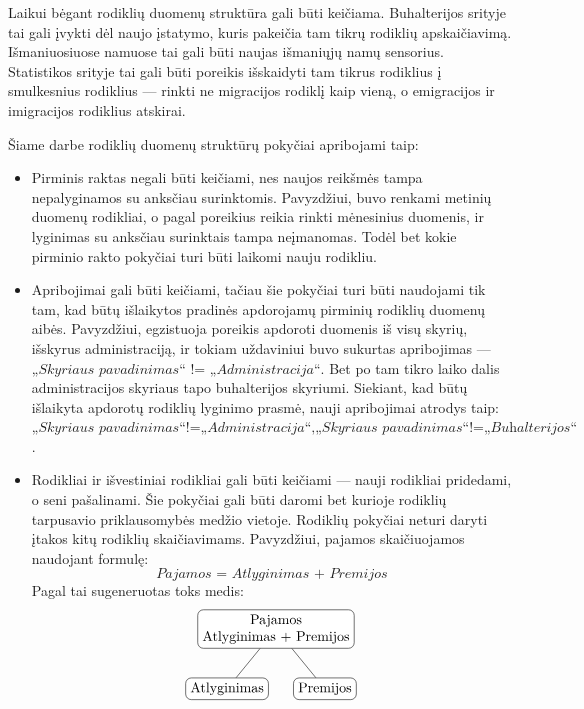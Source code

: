 \documentclass{VUMIFPSbakalaurinis}
\begin{document}
Laikui bėgant rodiklių duomenų struktūra gali būti keičiama. Buhalterijos srityje tai gali įvykti dėl naujo įstatymo, kuris pakeičia tam tikrų rodiklių apskaičiavimą. Išmaniuosiuose namuose tai gali būti naujas išmaniųjų namų sensorius. Statistikos srityje tai gali būti poreikis išskaidyti tam tikrus rodiklius į smulkesnius rodiklius — rinkti ne migracijos rodiklį kaip vieną, o emigracijos ir imigracijos rodiklius atskirai. \par
Šiame darbe rodiklių duomenų struktūrų pokyčiai apribojami taip:
\begin{itemize}
    \item Pirminis raktas negali būti keičiami, nes naujos reikšmės tampa nepalyginamos su anksčiau surinktomis. Pavyzdžiui, buvo renkami metinių duomenų rodikliai, o pagal poreikius reikia rinkti mėnesinius duomenis, ir lyginimas su anksčiau surinktais tampa neįmanomas. Todėl bet kokie pirminio rakto pokyčiai turi būti laikomi nauju rodikliu. 
    \item Apribojimai gali būti keičiami, tačiau šie pokyčiai turi būti naudojami tik tam, kad būtų išlaikytos pradinės apdorojamų pirminių rodiklių duomenų aibės. Pavyzdžiui, egzistuoja poreikis apdoroti duomenis iš visų skyrių, išskyrus administraciją, ir tokiam uždaviniui buvo sukurtas apribojimas — \(\textit{„Skyriaus pavadinimas“ != „Administracija“}\). Bet po tam tikro laiko dalis administracijos skyriaus tapo buhalterijos skyriumi. Siekiant, kad būtų išlaikyta apdorotų rodiklių lyginimo prasmė, nauji apribojimai atrodys taip: \(\textit{„Skyriaus pavadinimas“!=„Administracija“}, \textit{„Skyriaus pavadinimas“!=„Buhalterijos“}\).
    \item Rodikliai ir išvestiniai rodikliai gali būti keičiami — nauji rodikliai pridedami, o seni pašalinami. Šie pokyčiai gali būti daromi bet kurioje rodiklių tarpusavio priklausomybės medžio vietoje. Rodiklių pokyčiai neturi daryti įtakos kitų rodiklių skaičiavimams. Pavyzdžiui, pajamos skaičiuojamos naudojant formulę: \[\textit{Pajamos = Atlyginimas + Premijos}\] Pagal tai sugeneruotas toks medis: 
    \[	
        \begin{tikzpicture}[sibling distance=7em,	
            every node/.style = {shape=rectangle, rounded corners,	
                                 draw, align=center,	
                                 top color=white, bottom color=white}]	
            \node {Pajamos\\Atlyginimas + Premijos}	
                    child { node {Atlyginimas} }	
                    child { node {Premijos} } ;	
        \end{tikzpicture} 	
\]
\end{itemize}
\end{document}
